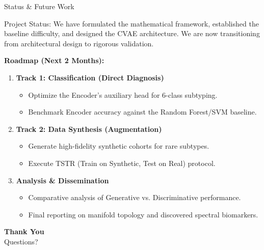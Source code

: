 \documentclass[aspectratio=169, 10pt]{beamer}
\begin{document}
\begin{frame}{Status \& Future Work}
    \begin{block}{Project Status:}
        We have formulated the mathematical framework, established the baseline difficulty, and designed the CVAE architecture. We are now transitioning from architectural design to rigorous validation.
    \end{block}
    
    \vspace{0.5em}
    \textbf{Roadmap (Next 2 Months):}
    \begin{enumerate}
        \item \textbf{Track 1: Classification (Direct Diagnosis)}
        \begin{itemize}
            \item Optimize the Encoder's auxiliary head for 6-class subtyping.
            \item Benchmark Encoder accuracy against the Random Forest/SVM baseline.
        \end{itemize}
        
        \item \textbf{Track 2: Data Synthesis (Augmentation)}
        \begin{itemize}
            \item Generate high-fidelity synthetic cohorts for rare subtypes.
            \item Execute TSTR (Train on Synthetic, Test on Real) protocol.
        \end{itemize}
        
        \item \textbf{Analysis \& Dissemination}
        \begin{itemize}
            \item Comparative analysis of Generative vs. Discriminative performance.
            \item Final reporting on manifold topology and discovered spectral biomarkers.
        \end{itemize}
    \end{enumerate}
\end{frame}

\begin{frame}
    \centering
    \Huge \textbf{Thank You} \\
    \vspace{1em}
    \large Questions?
\end{frame}
\end{document}
